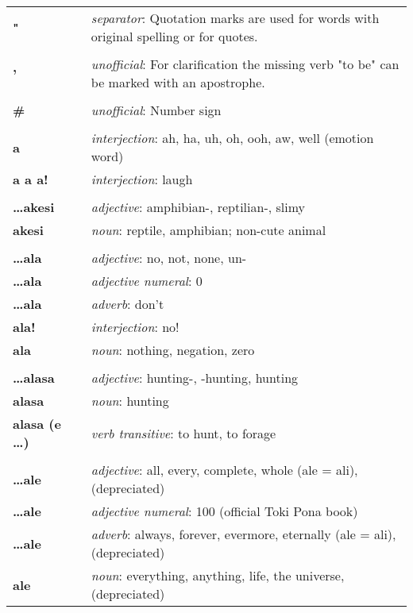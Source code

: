 \begin{supertabular}{p{2,5cm}|ll}
\textbf{"} && \textit{separator}: Quotation marks are used for words with original spelling or for quotes. \\ 
 && \\ %
\textbf{'} && \textit{unofficial}: For clarification the missing verb "to be" can be marked with an apostrophe.  \\ 
 && \\ %
\textbf{\#} && \textit{unofficial}: Number sign  \\ 
 && \\ %
\textbf{a} && \textit{interjection}: ah, ha, uh, oh, ooh, aw, well (emotion word) \\ 
\textbf{a a a!} && \textit{interjection}: laugh \\ 
 && \\ %
\textbf{\dots akesi} && \textit{adjective}: amphibian-, reptilian-, slimy \\ 
\textbf{akesi} && \textit{noun}: reptile, amphibian; non-cute animal \\ 
 && \\ %
\textbf{\dots ala} && \textit{adjective}: no, not, none, un- \\ 
\textbf{\dots ala} && \textit{adjective numeral}: 0 \\ 
\textbf{\dots ala} && \textit{adverb}: don't \\ 
\textbf{ala!} && \textit{interjection}: no! \\ 
\textbf{ala} && \textit{noun}: nothing, negation, zero \\ 
 && \\ %
\textbf{\dots alasa} && \textit{adjective}: hunting-, -hunting, hunting \\ 
\textbf{alasa} && \textit{noun}: hunting \\ 
\textbf{alasa (e \dots)} && \textit{verb transitive}: to hunt, to forage \\ 
 && \\ %
\textbf{\dots ale} && \textit{adjective}: all, every, complete, whole (ale = ali), (depreciated) \\ 
\textbf{\dots ale} && \textit{adjective numeral}: 100 (official Toki Pona book) \\ 
\textbf{\dots ale} && \textit{adverb}: always, forever, evermore, eternally (ale = ali), (depreciated) \\ 
\textbf{ale} && \textit{noun}: everything, anything, life, the universe, (depreciated) \\ 

\end{supertabular}
